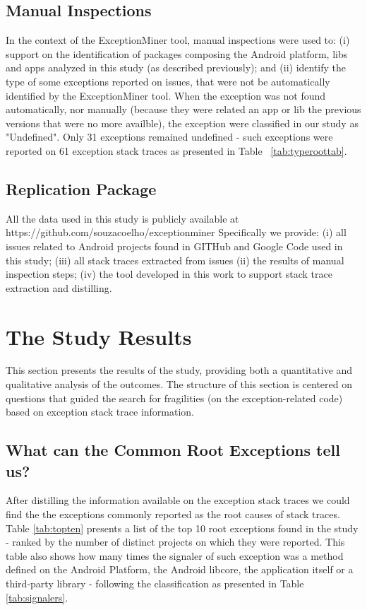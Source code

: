 \documentclass[conference]{IEEEtran}
\begin{document}
\subsection{Manual Inspections}
In the context of the ExceptionMiner tool, manual inspections were used to:
(i) support on the identification of packages composing the Android platform, 
libs and apps analyzed in this study (as described previously); and (ii)  
identify the type of some exceptions reported on issues, 
that were not be automatically identified by the ExceptionMiner tool.
When the exception was not found automatically, nor manually (because they were related an app or lib the previous versions
that were no more availble), the exception were classified 
in our study as "Undefined".  Only 31 exceptions 
remained undefined - such exceptions were reported on 61 exception stack traces as 
presented in Table ~\ref{tab:typeroottab}.

\subsection{Replication Package}
All the data used in this study is publicly available at https://github.com/souzacoelho/exceptionminer
Specifically we provide: (i) all issues related to Android projects found
in GITHub and Google Code used in this study; (iii) all stack traces extracted
from issues (ii) the results of manual inspection steps; (iv) the tool developed 
in this work to support stack trace extraction and distilling.

\section{The Study Results}
\label{sec:result}

This section presents the results of the study, providing both a
quantitative and qualitative analysis of the outcomes. The structure of this section
 is centered on questions that guided the search for fragilities (on the exception-related code)
based on exception stack trace information.

\subsection{What can the Common Root Exceptions tell us? }

After distilling the information available on the exception stack traces we could find 
the the exceptions commonly reported as the root causes of stack traces.
Table \ref{tab:topten} presents a list of the top 10 root exceptions found in the study - 
 ranked by the number of distinct projects on which they were reported. 
This table also shows how many times the signaler of such exception was a method defined on
the Android Platform, the Android libcore, the application itself or a third-party library -
 following the classification as presented in Table  \ref{tab:signalers}. 
\end{document}
